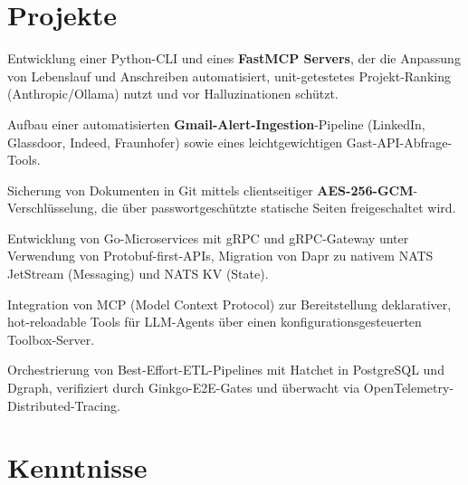 \documentclass[10pt,a4paper]{resume}
\begin{document}
\vspace{2pt}

\section{Projekte}

\bullets
  \item Entwicklung einer Python-CLI und eines \textbf{FastMCP Servers}, der die Anpassung von Lebenslauf und Anschreiben automatisiert, unit-getestetes Projekt-Ranking (Anthropic/Ollama) nutzt und vor Halluzinationen schützt.
  \item Aufbau einer automatisierten \textbf{Gmail-Alert-Ingestion}-Pipeline (LinkedIn, Glassdoor, Indeed, Fraunhofer) sowie eines leichtgewichtigen Gast-API-Abfrage-Tools.
  \item Sicherung von Dokumenten in Git mittels clientseitiger \textbf{AES-256-GCM}-Verschlüsselung, die über passwortgeschützte statische Seiten freigeschaltet wird.
\bulletsend
\vspace{1.0pt}
\bullets
  \item Entwicklung von Go-Microservices mit gRPC und gRPC-Gateway unter Verwendung von Protobuf-first-APIs, Migration von Dapr zu nativem NATS JetStream (Messaging) und NATS KV (State).
  \item Integration von MCP (Model Context Protocol) zur Bereitstellung deklarativer, hot-reloadable Tools für LLM-Agents über einen konfigurationsgesteuerten Toolbox-Server.
  \item Orchestrierung von Best-Effort-ETL-Pipelines mit Hatchet in PostgreSQL und Dgraph, verifiziert durch Ginkgo-E2E-Gates und überwacht via OpenTelemetry-Distributed-Tracing.
\bulletsend

\section{Kenntnisse}
\end{document}
